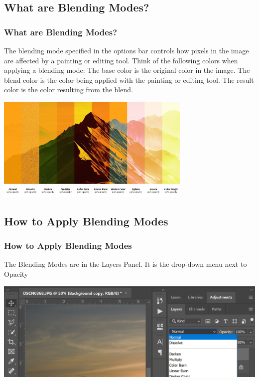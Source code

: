 \documentclass{beamer}
\begin{document}
\subsection{What are Blending Modes?}
\begin{frame}
	\frametitle{What are Blending Modes?}
	\begin{outline}
		\1 The blending mode specified in the options bar controls how pixels in the image are affected by a painting or editing tool. 
		\1 Think of the following colors when applying a blending mode:
		\2 The base color is the original color in the image.
		\2 The blend color is the color being applied with the painting or editing tool.
		\2 The result color is the color resulting from the blend.
	\end{outline}
	\begin{center}
		\includegraphics[width = 0.7\textwidth]{images/Photoshop-blend-layer-effects-orange-1.jpg}
	\end{center}
\end{frame}

\subsection{How to Apply Blending Modes}
\begin{frame}
	\frametitle{How to Apply Blending Modes}
	\begin{outline}
		\1 The Blending Modes are in the Layers Panel.
		\1 It is the drop-down menu next to Opacity
	\end{outline}
	\begin{center}
	\includegraphics[width = 1.0\textwidth]{images/blending modes 3.png}
\end{center}
\end{frame}
\end{document}
